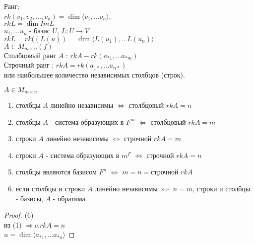 \documentclass[12pt]{report}
\begin{document}
\begin{defn}Ранг:\\
    $rk (v_1, v_2 , \ldots , v_n) = \dim \langle v_1, \ldots v_n \rangle $, \\
    $rk L = \dim Im L$\\
    $u_1, \ldots u_n $ - базис $U$, $L: U \to V$ \\
    $rk L = rk ((L(u)) = \dim \langle L(u_1), \ldots L(u_n) \rangle $\\
    $A \in M _ {m \times n} (f)$\\
    Столбцовый ранг  $A$ : $rk A - rk(a_{*1}, \ldots a_{*m})$\\
    Строчный ранг : $rk A = rk (a_{1*}, \ldots a_{n*})$\\
    или наибольшее количество независимых столбцов (строк).
\end{defn}
\begin{lm}
    $A \in M_{m \times n}$
     \begin{enumerate}
	 \item столбцы $A$ линейно независимы $\Leftrightarrow$   столбцовый $rk A = n$ 
	 \item столбцы $A$  - система образующих в $F^m$ $\Leftrightarrow$  столбцовый $rk A = m$
	 \item строки $A$ линейно независимы $\Leftrightarrow$ строчной $rk A = m$ 
	 \item строки $A$  - система образующих в $m^F$ $\Leftrightarrow$ строчной $ rk A = n$ 
	 \item столбцы являются базисом $F^n$ $\Leftrightarrow$ $m = n =  \mbox{строчной }rk A$
	 \item если столбцы и строки  $A$ линейно независимы $\Leftrightarrow$ $n = m $, строки и столбцы - базисы, $A$ - обратима.
    \end{enumerate}
\end{lm}
\begin{proof}
    (6)\\
    из (1) $\Rightarrow  c.rk A = n $\\
    $n = \dim \langle a_{*1}, \ldots a_{*n} \rangle $
\end{proof}
\end{document}
